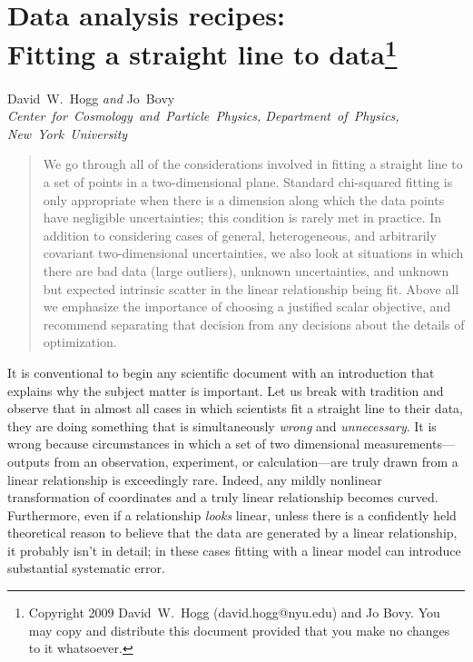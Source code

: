 \documentclass[12pt]{article}
\begin{document}
\section*{Data analysis recipes:\ \\
  Fitting a straight line to data\footnote{
    Copyright 2009 David~W.~Hogg (david.hogg@nyu.edu) and Jo Bovy.
    You may copy and distribute this document
    provided that you make no changes to it whatsoever.}}

\noindent
David~W.~Hogg \textsl{and}
Jo~Bovy\\
\textsl{Center~for~Cosmology~and~Particle~Physics, Department~of~Physics,\\
New~York~University}

\begin{abstract}
  We go through all of the considerations involved in fitting a
  straight line to a set of points in a two-dimensional plane.
  Standard chi-squared fitting is only appropriate when there is a
  dimension along which the data points have negligible uncertainties;
  this condition is rarely met in practice.  In addition to
  considering cases of general, heterogeneous, and arbitrarily
  covariant two-dimensional uncertainties, we also look at situations
  in which there are bad data (large outliers), unknown uncertainties,
  and unknown but expected intrinsic scatter in the linear
  relationship being fit.  Above all we emphasize the importance of
  choosing a justified scalar objective, and recommend separating that
  decision from any decisions about the details of optimization.
\end{abstract}

It is conventional to begin any scientific document with an
introduction that explains why the subject matter is important.  Let
us break with tradition and observe that in almost all cases in which
scientists fit a straight line to their data, they are doing something
that is simultaneously \emph{wrong} and \emph{unnecessary}.  It is
wrong because circumstances in which a set of two dimensional
measurements---outputs from an observation, experiment, or
calculation---are truly drawn from a linear relationship is
exceedingly rare.  Indeed, any mildly nonlinear transformation of
coordinates and a truly linear relationship becomes curved.
Furthermore, even if a relationship \emph{looks} linear, unless there
is a confidently held theoretical reason to believe that the data are
generated by a linear relationship, it probably isn't in detail; in
these cases fitting with a linear model can introduce substantial
systematic error.
\end{document}
